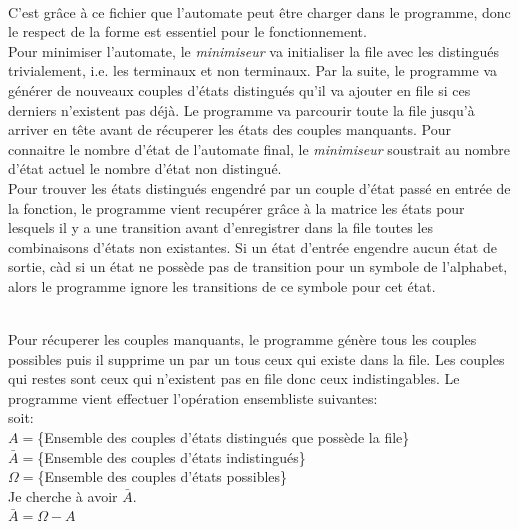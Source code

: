 \documentclass[a4paper]{article}
\begin{document}
\fbox{
	
}\\

C'est grâce à ce fichier que l'automate peut être charger dans le programme, donc le respect
de la forme est essentiel pour le fonctionnement.\\

Pour minimiser l'automate, le \textit{minimiseur} va initialiser la file avec les distingués
trivialement, i.e. les terminaux et non terminaux. Par la suite, le programme va générer de
nouveaux couples d'états distingués qu'il va ajouter en file si ces derniers n'existent pas
déjà. Le programme va parcourir toute la file jusqu'à arriver en tête avant de récuperer les
états des couples manquants. Pour connaitre le nombre d'état de l'automate final, le \textit{minimiseur}
soustrait au nombre d'état actuel le nombre d'état non distingué.\\

Pour trouver les états distingués engendré par un couple d'état passé en entrée de la fonction,
le programme vient recupérer grâce
à la matrice les états pour lesquels il y a une transition avant d'enregistrer dans la file toutes
les combinaisons d'états non existantes. Si un état d'entrée engendre aucun état de sortie, càd
si un état ne possède pas de transition pour un symbole de l'alphabet, alors
le programme ignore les transitions de ce symbole pour cet état.

\fbox{
	
}\\

Pour récuperer les couples manquants, le programme génère tous les couples possibles puis
il supprime un par un tous ceux qui existe dans la file. Les couples qui restes sont ceux
qui n'existent pas en file donc ceux indistingables. Le programme vient effectuer l'opération
ensembliste suivantes:\\

	soit:\\
	$A=$\{Ensemble des couples d'états distingués que possède la file\}\\
	$\bar{A}=$\{Ensemble des couples d'états indistingués\}\\
	$\Omega=$\{Ensemble des couples d'états possibles\}\\

	Je cherche à avoir $\bar{A}$.\\

	$\bar{A}=\Omega-A$
\end{document}
